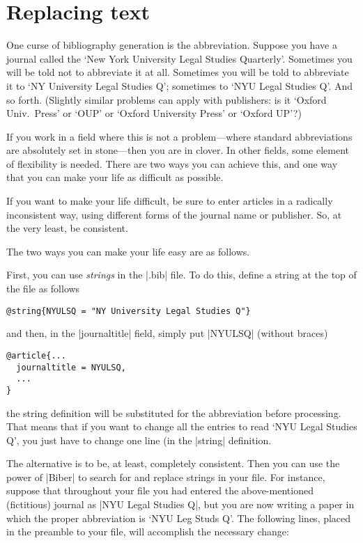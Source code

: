 \section{Replacing text}

One curse of bibliography generation is the abbreviation. Suppose you
have a journal called the `New York University Legal Studies
Quarterly'. Sometimes you will be told not to abbreviate it at
all. Sometimes you will be told to abbreviate it to `NY University
Legal Studies Q'; sometimes to `NYU Legal Studies Q'. And so
forth. (Slightly similar problems can apply with publishers: is it
`Oxford Univ.\ Press' or `OUP' or `Oxford University Press' or `Oxford
UP'?)

If you work in a field where this is not a problem---where standard
abbreviations are absolutely set in stone---then you are in
clover. In other fields, some element of flexibility is needed. There
are two ways you can achieve this, and one way that you can make your
life as difficult as possible.

If you want to make your life difficult, be sure to enter articles in
a radically inconsistent way, using different forms of the journal
name or publisher. So, at the very least, be consistent.

The two ways you can make your life easy are as follows.

First, you can use \emph{strings} in the |.bib| file. To do this,
define a string at the top of the file as follows
\begin{Verbatim}
@string{NYULSQ = "NY University Legal Studies Q"}
\end{Verbatim}
and then, in the |journaltitle| field, simply put |NYULSQ| (without braces)
\begin{Verbatim}
@article{...
  journaltitle = NYULSQ,
  ...
}
\end{Verbatim}
the string definition will be substituted for the abbreviation before
processing. That means that if you want to change all the entries to
read `NYU Legal Studies Q', you just have to change one line (in the
|string| definition.

The alternative is to be, at least, completely consistent. Then you
can use the power of |Biber| to search for and replace strings in your
file. For instance, suppose that throughout your file you had entered
the above-mentioned (fictitious) journal as |NYU Legal Studies Q|, but
you are now writing a paper in which the proper abbreviation is `NYU
Leg Studs Q'. The following lines, placed in the preamble to your
file, will accomplish the necessary change:\label{datamap}

